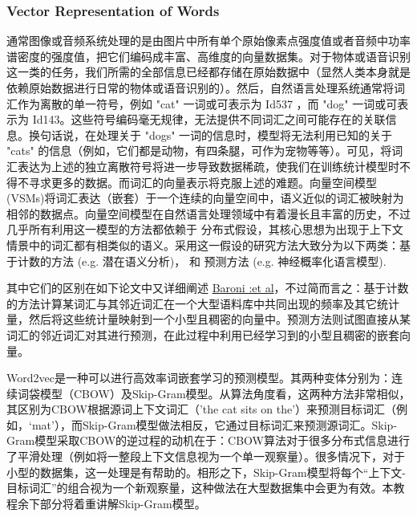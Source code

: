 \subsubsection{Vector Representation of Words}
通常图像或音频系统处理的是由图片中所有单个原始像素点强度值或者音频中功率谱密度的强度值，把它们编码成丰富、高维度的向量数据集。对于物体或语音识别这一类的任务，我们所需的全部信息已经都存储在原始数据中（显然人类本身就是依赖原始数据进行日常的物体或语音识别的）。然后，自然语言处理系统通常将词汇作为离散的单一符号，例如 "cat" 一词或可表示为 Id537 ，而 "dog" 一词或可表示为 Id143。这些符号编码毫无规律，无法提供不同词汇之间可能存在的关联信息。换句话说，在处理关于 "dogs" 一词的信息时，模型将无法利用已知的关于 "cats" 的信息（例如，它们都是动物，有四条腿，可作为宠物等等）。可见，将词汇表达为上述的独立离散符号将进一步导致数据稀疏，使我们在训练统计模型时不得不寻求更多的数据。而词汇的向量表示将克服上述的难题。向量空间模型 (VSMs)将词汇表达（嵌套）于一个连续的向量空间中，语义近似的词汇被映射为相邻的数据点。向量空间模型在自然语言处理领域中有着漫长且丰富的历史，不过几乎所有利用这一模型的方法都依赖于 分布式假设，其核心思想为出现于上下文情景中的词汇都有相类似的语义。采用这一假设的研究方法大致分为以下两类：基于计数的方法 (e.g. 潜在语义分析)， 和 预测方法 (e.g. 神经概率化语言模型).

其中它们的区别在如下论文中又详细阐述 \href{http://clic.cimec.unitn.it/marco/publications/acl2014/baroni-etal-countpredict-acl2014.pdf}{Baroni :et al}，不过简而言之：基于计数的方法计算某词汇与其邻近词汇在一个大型语料库中共同出现的频率及其它统计量，然后将这些统计量映射到一个小型且稠密的向量中。预测方法则试图直接从某词汇的邻近词汇对其进行预测，在此过程中利用已经学习到的小型且稠密的嵌套向量。

Word2vec是一种可以进行高效率词嵌套学习的预测模型。其两种变体分别为：连续词袋模型（CBOW）及Skip-Gram模型。从算法角度看，这两种方法非常相似，其区别为CBOW根据源词上下文词汇（'the cat sits on the'）来预测目标词汇（例如，‘mat’），而Skip-Gram模型做法相反，它通过目标词汇来预测源词汇。Skip-Gram模型采取CBOW的逆过程的动机在于：CBOW算法对于很多分布式信息进行了平滑处理（例如将一整段上下文信息视为一个单一观察量）。很多情况下，对于小型的数据集，这一处理是有帮助的。相形之下，Skip-Gram模型将每个“上下文-目标词汇”的组合视为一个新观察量，这种做法在大型数据集中会更为有效。本教程余下部分将着重讲解Skip-Gram模型。
